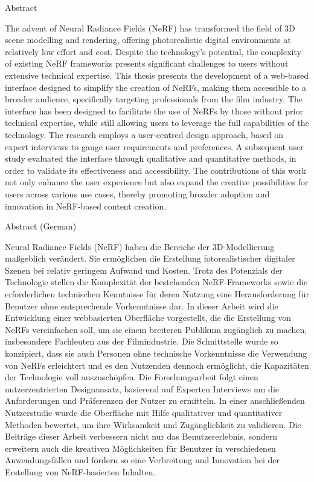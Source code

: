 %

{Abstract}\label{sec:abstract} \\
\vspace*{-2mm}

The advent of Neural Radiance Fields (NeRF) has transformed the field of 3D scene modelling and rendering, offering photorealistic digital environments at relatively low effort and cost.
Despite the technology's potential, the complexity of existing NeRF frameworks presents significant challenges to users without extensive technical expertise.
This thesis presents the development of a web-based interface designed to simplify the creation of NeRFs, making them accessible to a broader audience, specifically targeting professionals from the film industry.
The interface has been designed to facilitate the use of NeRFs by those without prior technical expertise, while still allowing users to leverage the full capabilities of the technology.
The research employs a user-centred design approach, based on expert interviews to gauge user requirements and preferences.
A subsequent user study evaluated the interface through qualitative and quantitative methods, in order to validate its effectiveness and accessibility.
The contributions of this work not only enhance the user experience but also expand the creative possibilities for users across various use cases, thereby promoting broader adoption and innovation in NeRF-based content creation.

\vspace*{10mm}

{Abstract (German)}\label{sec:abstract-diff} \\
\vspace*{-2mm}

Neural Radiance Fields (NeRF) haben die Bereiche der 3D-Modellierung ma{\ss}geblich verändert.
Sie ermöglichen die Erstellung fotorealistischer digitaler Szenen bei relativ geringem Aufwand und Kosten.
Trotz des Potenzials der Technologie stellen die Komplexität der bestehenden NeRF-Frameworks sowie die erforderlichen technischen Kenntnisse für deren Nutzung eine Herausforderung für Benutzer ohne entsprechende Vorkenntnisse dar.
In dieser Arbeit wird die Entwicklung einer webbasierten Oberfläche vorgestellt, die die Erstellung von NeRFs vereinfachen soll, um sie einem breiteren Publikum zugänglich zu machen, insbesondere Fachleuten aus der Filmindustrie.
Die Schnittstelle wurde so konzipiert, dass sie auch Personen ohne technische Vorkenntnisse die Verwendung von NeRFs erleichtert und es den Nutzenden dennoch ermöglicht, die Kapazitäten der Technologie voll auszuschöpfen.
Die Forschungsarbeit folgt einen nutzerzentrierten Designansatz, basierend auf Experten Interviews um die Anforderungen und Präferenzen der Nutzer zu ermitteln.
In einer anschlie{\ss}enden Nutzerstudie wurde die Oberfläche mit Hilfe qualitativer und quantitativer Methoden bewertet, um ihre Wirksamkeit und Zugänglichkeit zu validieren.
Die Beiträge dieser Arbeit verbessern nicht nur das Benutzererlebnis, sondern erweitern auch die kreativen Möglichkeiten für Benutzer in verschiedenen Anwendungsfällen und fördern so eine Verbreitung und Innovation bei der Erstellung von NeRF-basierten Inhalten.
